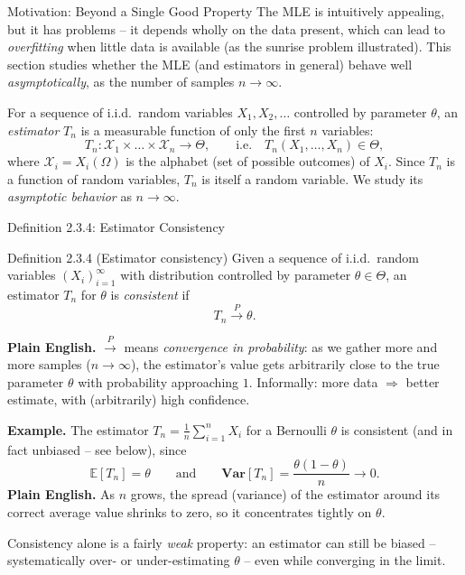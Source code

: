 \documentclass[aspectratio=169,10pt]{beamer}
\begin{document}
\begin{frame}{Motivation: Beyond a Single Good Property}
  The MLE is intuitively appealing, but it has problems -- it depends
  wholly on the data present, which can lead to \emph{overfitting} when
  little data is available (as the sunrise problem illustrated). This
  section studies whether the MLE (and estimators in general) behave well
  \emph{asymptotically}, as the number of samples $n \to \infty$.

  For a sequence of i.i.d.\ random variables $X_1, X_2, \dots$ controlled
  by parameter $\theta$, an \emph{estimator} $T_n$ is a measurable function
  of only the first $n$ variables:
  \[
    T_n : \mathcal{X}_1 \times \dots \times \mathcal{X}_n \to \Theta,
    \qquad \text{i.e.} \quad T_n(X_1,\dots,X_n) \in \Theta,
  \]
  where $\mathcal{X}_i = X_i(\Omega)$ is the alphabet (set of possible
  outcomes) of $X_i$. Since $T_n$ is a function of random variables, $T_n$
  is itself a random variable. We study its \emph{asymptotic behavior} as
  $n \to \infty$.
\end{frame}

\begin{frame}{Definition 2.3.4: Estimator Consistency}
  \begin{block}{Definition 2.3.4 (Estimator consistency)}
    Given a sequence of i.i.d.\ random variables $(X_i)_{i=1}^\infty$ with
    distribution controlled by parameter $\theta \in \Theta$, an estimator
    $T_n$ for $\theta$ is \emph{consistent} if
    \[
      T_n \xrightarrow{P} \theta.
    \]
  \end{block}
  \textbf{Plain English.} $\xrightarrow{P}$ means \emph{convergence in
  probability}: as we gather more and more samples ($n \to \infty$), the
  estimator's value gets arbitrarily close to the true parameter $\theta$
  with probability approaching $1$. Informally: more data $\Rightarrow$
  better estimate, with (arbitrarily) high confidence.

  \textbf{Example.} The estimator $T_n = \frac{1}{n}\sum_{i=1}^n X_i$ for a
  Bernoulli $\theta$ is consistent (and in fact unbiased -- see below),
  since
  \[
    \mathbb{E}[T_n] = \theta \qquad \text{and} \qquad
    \mathbf{Var}[T_n] = \frac{\theta(1-\theta)}{n} \longrightarrow 0.
  \]
  \textbf{Plain English.} As $n$ grows, the spread (variance) of the
  estimator around its correct average value shrinks to zero, so it
  concentrates tightly on $\theta$.

  Consistency alone is a fairly \emph{weak} property: an estimator can
  still be biased -- systematically over- or under-estimating $\theta$ --
  even while converging in the limit.
\end{frame}
\end{document}
